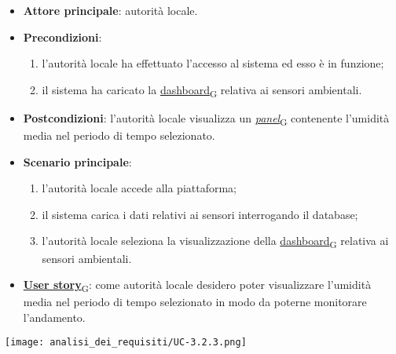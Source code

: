 \begin{itemize}
	\item \textbf{Attore principale}: autorità locale.
	\item \textbf{Precondizioni}:
	      \begin{enumerate}
		      \item l'autorità locale ha effettuato l'accesso al sistema ed esso è in funzione;
		      \item il sistema ha caricato la \href{https://7last.github.io/docs/pb/documentazione-interna/glossario\#dashboard}{dashboard\textsubscript{G}} relativa ai sensori ambientali.
	      \end{enumerate}
	\item \textbf{Postcondizioni}: l'autorità locale visualizza un \href{https://7last.github.io/docs/pb/documentazione-interna/glossario\#panel}{\textit{panel}\textsubscript{G}} contenente l'umidità media nel periodo di tempo selezionato.
	\item \textbf{Scenario principale}:
	      \begin{enumerate}
		      \item l'autorità locale accede alla piattaforma;
		      \item il sistema carica i dati relativi ai sensori interrogando il database;
		      \item l'autorità locale seleziona la visualizzazione della \href{https://7last.github.io/docs/pb/documentazione-interna/glossario\#dashboard}{dashboard\textsubscript{G}} relativa ai sensori ambientali.
	      \end{enumerate}
	\item \href{https://7last.github.io/docs/pb/documentazione-interna/glossario\#user-story}{\textbf{User story}\textsubscript{G}}: come autorità locale desidero poter visualizzare l'umidità media nel periodo di tempo selezionato
	      in modo da poterne monitorare l'andamento.
\end{itemize}
\begin{center}
	\texttt{[image: analisi\_dei\_requisiti/UC-3.2.3.png]}
\end{center}


